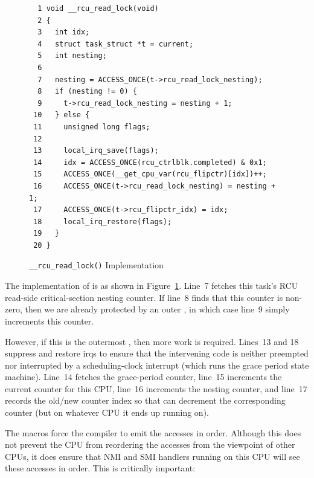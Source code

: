 \begin{figure}[tbp]
{ \scriptsize
\begin{verbatim}
  1 void __rcu_read_lock(void)
  2 {
  3   int idx;
  4   struct task_struct *t = current;
  5   int nesting;
  6
  7   nesting = ACCESS_ONCE(t->rcu_read_lock_nesting);
  8   if (nesting != 0) {
  9     t->rcu_read_lock_nesting = nesting + 1;
 10   } else {
 11     unsigned long flags;
 12
 13     local_irq_save(flags);
 14     idx = ACCESS_ONCE(rcu_ctrlblk.completed) & 0x1;
 15     ACCESS_ONCE(__get_cpu_var(rcu_flipctr)[idx])++;
 16     ACCESS_ONCE(t->rcu_read_lock_nesting) = nesting + 1;
 17     ACCESS_ONCE(t->rcu_flipctr_idx) = idx;
 18     local_irq_restore(flags);
 19   }
 20 }
\end{verbatim}
}
\caption{{\tt \_\_rcu\_read\_lock()} Implementation}
\label{fig:app:rcuimpl:__rcu_read_lock() Implementation}
\end{figure}

The implementation of  is as shown in
Figure~\ref{fig:app:rcuimpl:__rcu_read_lock() Implementation}.
Line~7 fetches this task's RCU read-side critical-section nesting
counter.
If line~8 finds that this counter is non-zero,
then we are already protected by an outer
, in which case line~9 simply increments
this counter.

However, if this is the outermost ,
then more work is required.
Lines~13 and 18 suppress and restore irqs to ensure that the
intervening code is neither preempted nor interrupted by a
scheduling-clock interrupt (which runs the grace period state machine).
Line~14 fetches the grace-period counter,
line~15 increments the current counter for
this CPU, line~16 increments the nesting counter,
and line~17 records the old/new counter index so that
 can decrement the corresponding
counter (but on whatever CPU it ends up running on).

The  macros force the compiler to
emit the accesses in order.
Although this does not prevent the CPU from reordering the accesses
from the viewpoint of other CPUs, it does ensure that NMI and
SMI handlers running on this CPU will see these accesses in order.
This is critically important:

